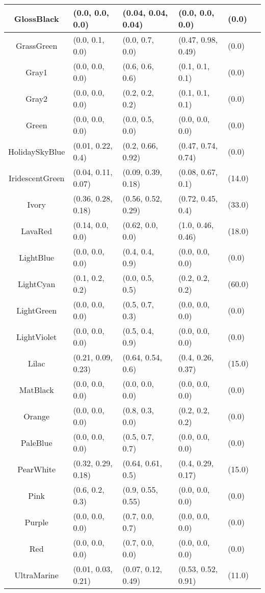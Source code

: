 \begin{table}[H]
\begin{footnotesize}
\begin{center}
\begin{tabular}{|c||l|l|l|l|l|}
GlossBlack & (0.0, 0.0, 0.0) & (0.04, 0.04, 0.04) & (0.0, 0.0, 0.0) & (0.0) \\ \hline
GrassGreen & (0.0, 0.1, 0.0) & (0.0, 0.7, 0.0) & (0.47, 0.98, 0.49) & (0.0) \\ \hline
Gray1 & (0.0, 0.0, 0.0) & (0.6, 0.6, 0.6) & (0.1, 0.1, 0.1) & (0.0) \\ \hline
Gray2 & (0.0, 0.0, 0.0) & (0.2, 0.2, 0.2) & (0.1, 0.1, 0.1) & (0.0) \\ \hline
Green & (0.0, 0.0, 0.0) & (0.0, 0.5, 0.0) & (0.0, 0.0, 0.0) & (0.0) \\ \hline
HolidaySkyBlue & (0.01, 0.22, 0.4) & (0.2, 0.66, 0.92) & (0.47, 0.74, 0.74) & (0.0) \\ \hline
IridescentGreen & (0.04, 0.11, 0.07) & (0.09, 0.39, 0.18) & (0.08, 0.67, 0.1) & (14.0) \\ \hline
Ivory & (0.36, 0.28, 0.18) & (0.56, 0.52, 0.29) & (0.72, 0.45, 0.4) & (33.0) \\ \hline
LavaRed & (0.14, 0.0, 0.0) & (0.62, 0.0, 0.0) & (1.0, 0.46, 0.46) & (18.0) \\ \hline
LightBlue & (0.0, 0.0, 0.0) & (0.4, 0.4, 0.9) & (0.0, 0.0, 0.0) & (0.0) \\ \hline
LightCyan & (0.1, 0.2, 0.2) & (0.0, 0.5, 0.5) & (0.2, 0.2, 0.2) & (60.0) \\ \hline
LightGreen & (0.0, 0.0, 0.0) & (0.5, 0.7, 0.3) & (0.0, 0.0, 0.0) & (0.0) \\ \hline
LightViolet & (0.0, 0.0, 0.0) & (0.5, 0.4, 0.9) & (0.0, 0.0, 0.0) & (0.0) \\ \hline
Lilac & (0.21, 0.09, 0.23) & (0.64, 0.54, 0.6) & (0.4, 0.26, 0.37) & (15.0) \\ \hline
MatBlack & (0.0, 0.0, 0.0) & (0.0, 0.0, 0.0) & (0.0, 0.0, 0.0) & (0.0) \\ \hline
Orange & (0.0, 0.0, 0.0) & (0.8, 0.3, 0.0) & (0.2, 0.2, 0.2) & (0.0) \\ \hline
PaleBlue & (0.0, 0.0, 0.0) & (0.5, 0.7, 0.7) & (0.0, 0.0, 0.0) & (0.0) \\ \hline
PearWhite & (0.32, 0.29, 0.18) & (0.64, 0.61, 0.5) & (0.4, 0.29, 0.17) & (15.0) \\ \hline
Pink & (0.6, 0.2, 0.3) & (0.9, 0.55, 0.55) & (0.0, 0.0, 0.0) & (0.0) \\ \hline
Purple & (0.0, 0.0, 0.0) & (0.7, 0.0, 0.7) & (0.0, 0.0, 0.0) & (0.0) \\ \hline
Red & (0.0, 0.0, 0.0) & (0.7, 0.0, 0.0) & (0.0, 0.0, 0.0) & (0.0) \\ \hline
UltraMarine & (0.01, 0.03, 0.21) & (0.07, 0.12, 0.49) & (0.53, 0.52, 0.91) & (11.0) \\ \hline

\end{tabular}
\end{center}
\end{footnotesize}
\end{table}
